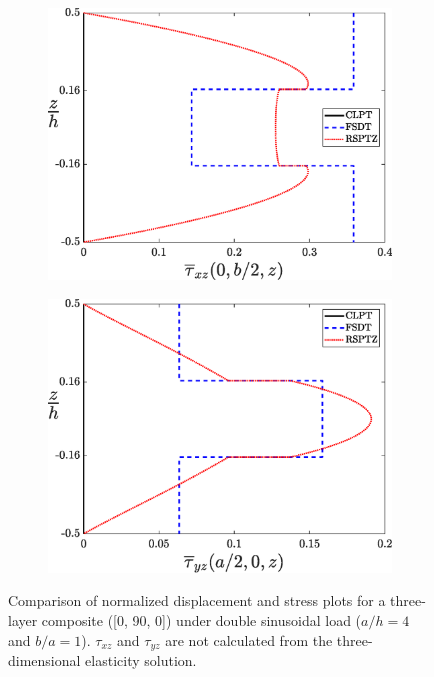 \documentclass{article}
\begin{document}
\begin{figure}[!]
        \begin{subfigure}{0.5\textwidth}
            \includegraphics[width=1\linewidth, height=0.8\linewidth]{figures/tau__xz_bar.eps} 
            \caption{}
            \label{fig:tau__xz_bar}
        \end{subfigure}
        \begin{subfigure}{0.5\textwidth}
            \includegraphics[width=1\linewidth, height=0.8\linewidth]{figures/tau__yz_bar.eps} 
            \caption{}
            \label{fig:tau__yz_bar}
        \end{subfigure}
    \caption{Comparison of normalized displacement and stress plots for a three-layer composite ([0, 90, 0]) under double sinusoidal load ($a/h=4$ and $b/a=1$). $\tau_{xz}$ and $\tau_{yz}$ are not calculated from the three-dimensional elasticity solution.}
    \label{fig:result}
\end{figure}
\end{document}
